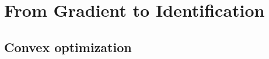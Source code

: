 \chapter{From Gradient to Identification}
\label{ch:basics}
\localtableofcontents

\section{Convex optimization}











%
